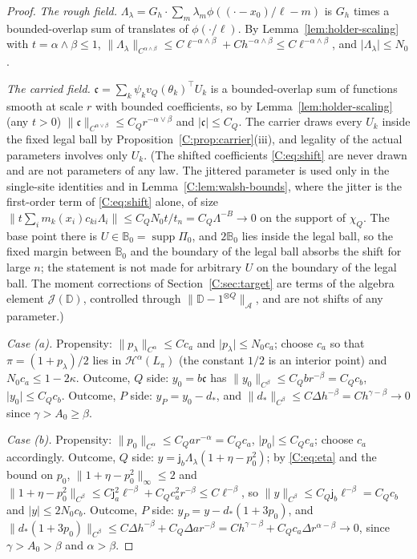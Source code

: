 \documentclass[11pt]{article}
\newcommand{\cA}{\mathcal{A}}
\newcommand{\cH}{\mathcal{H}}
\newcommand{\cJ}{\mathcal{J}}
\newcommand{\norm}[1]{\lVert #1\rVert}
\newcommand{\abs}[1]{\lvert #1\rvert}
\newcommand{\ja}{\mathsf{j}_a}
\newcommand{\jb}{\mathsf{j}_b}
\newcommand{\cf}{\mathfrak{c}}
\begin{document}
\begin{proof}
\emph{The rough field.}  \(\Lambda_\lambda=G_h\cdot\sum_m\lambda_m
\phi((\cdot-x_0)/\ell-m)\) is \(G_h\) times a bounded-overlap sum of
translates of \(\phi(\cdot/\ell)\).  By Lemma~\ref{lem:holder-scaling}
with \(t=\alpha\wedge\beta\le1\), \(\norm{\Lambda_\lambda}_{C^{\alpha\wedge\beta}}\le C\ell^{-\alpha\wedge\beta}
+Ch^{-\alpha\wedge\beta}\le C\ell^{-\alpha\wedge\beta}\), and \(\abs{\Lambda_\lambda}\le N_0\).

\emph{The carried field.}  \(\cf=\sum_k\psi_kv_Q(\theta_k)^\top U_k\) is a
bounded-overlap sum of functions smooth at scale \(r\) with bounded
coefficients, so by Lemma~\ref{lem:holder-scaling} (any \(t>0\))
\(\norm{\cf}_{C^{\alpha\vee\beta}}\le C_Qr^{-\alpha\vee\beta}\) and \(\abs{\cf}\le C_Q\).
The carrier draws every \(U_k\) inside the fixed legal ball by
Proposition~\ref{C:prop:carrier}(iii), and legality of the actual
parameters involves only \(U_k\).  (The shifted coefficients
\eqref{C:eq:shift} are never drawn and are not parameters of any law.
The jittered parameter is used only in the single-site identities and in
Lemma~\ref{C:lem:walsh-bounds}, where the jitter is the first-order term
of \eqref{C:eq:shift} alone, of size
\(\norm{t\sum_im_k(x_i)c_{ki}\Lambda_i}\le C_QN_0t/t_n=C_Q\Lambda^{-B}\to0\) on
the support of \(\chi_Q\).  The base point there is
\(U\in\mathbb B_0=\operatorname{supp}\Pi_0\), and \(2\mathbb B_0\) lies
inside the legal ball, so the fixed margin between \(\mathbb B_0\) and
the boundary of the legal ball absorbs the shift for large \(n\); the
statement is not made for arbitrary \(U\) on the boundary of the legal
ball.  The moment corrections of
Section~\ref{C:sec:target} are terms of the algebra element
\(\cJ(\mathbb D)\), controlled through \(\norm{\mathbb D-1^{\otimes Q}}_\cA\),
and are not shifts of any parameter.)

\emph{Case (a).}  Propensity: \(\norm{p_\lambda}_{C^\alpha}\le Cc_a\) and
\(\abs{p_\lambda}\le N_0c_a\); choose \(c_a\) so that \(\pi=(1+p_\lambda)/2\)
lies in \(\cH^\alpha(L_\pi)\) (the constant \(1/2\) is an interior point)
and \(N_0c_a\le1-2\kappa\).  Outcome, \(Q\) side: \(y_0=b\cf\) has
\(\norm{y_0}_{C^\beta}\le C_Qbr^{-\beta}=C_Qc_b\), \(\abs{y_0}\le C_Qc_b\).
Outcome, \(P\) side: \(y_P=y_0-d_*\), and
\(\norm{d_*}_{C^\beta}\le C\Delta h^{-\beta}=Ch^{\gamma-\beta}\to0\) since
\(\gamma>A_0\ge\beta\).

\emph{Case (b).}  Propensity: \(\norm{p_0}_{C^\alpha}\le C_Qar^{-\alpha}=C_Qc_a\),
\(\abs{p_0}\le C_Qc_a\); choose \(c_a\) accordingly.  Outcome, \(Q\)
side: \(y=\jb\Lambda_\lambda(1+\eta-p_0^2)\); by \eqref{C:eq:eta} and the
bound on \(p_0\), \(\norm{1+\eta-p_0^2}_\infty\le2\) and
\(\norm{1+\eta-p_0^2}_{C^\beta}\le C\ja^2\ell^{-\beta}+C_Qc_a^2r^{-\beta}\le C\ell^{-\beta}\),
so \(\norm y_{C^\beta}\le C_Q\jb\ell^{-\beta}=C_Qc_b\) and \(\abs y\le2N_0c_b\).
Outcome, \(P\) side: \(y_P=y-d_*(1+3p_0)\), and
\(\norm{d_*(1+3p_0)}_{C^\beta}\le C\Delta h^{-\beta}+C_Q\Delta ar^{-\beta}
=Ch^{\gamma-\beta}+C_Qc_a\Delta r^{\alpha-\beta}\to0\), since
\(\gamma>A_0>\beta\) and \(\alpha>\beta\).


\end{proof}
\end{document}
